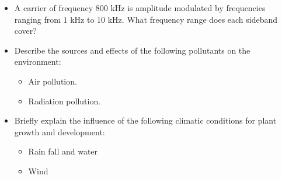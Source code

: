 \documentclass{article}
\begin{document}
\begin{itemize}
\item A carrier of frequency $ 800$ kHz is amplitude modulated by frequencies ranging from $ 1$ kHz to $ 10$ kHz.  What frequency range does each sideband cover?
\item Describe the sources and effects of the following pollutants on the environment:
 \begin{itemize}
\item Air pollution. 
\item Radiation pollution.
\end{itemize}
\item Briefly explain the influence of the following climatic conditions for plant growth and development:
 \begin{itemize}
\item Rain fall and water
\item Wind
\end{itemize}
\end{itemize}
\end{document}
